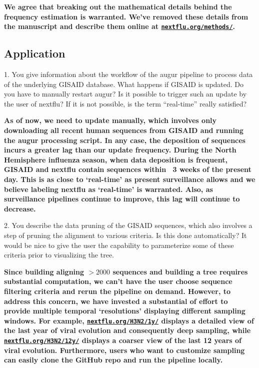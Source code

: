 \documentclass[11pt,oneside,letterpaper]{article}
\begin{document}
{\bf We agree that breaking out the mathematical details behind the frequency estimation is warranted. We've removed these details from the manuscript and describe them online at \href{http://nextflu.org/methods/}{\texttt{nextflu.org/methods/}}.}

\subsection*{Application}

1. You give information about the workflow of the augur pipeline to process data of the underlying GISAID database. What happens if GISAID is updated. Do you have to manually restart augur? Is it possible to trigger such an update by the user of nextflu? If it is not possible, is the term ``real-time'' really satisfied?

{\bf As of now, we need to update manually, which involves only downloading all recent human sequences from GISAID and running the augur processing script. In any case, the deposition of sequences incurs a greater lag than our update frequency. During the North Hemisphere influenza season, when data deposition is frequent, GISAID and nextflu contain sequences within ~3 weeks of the present day. This is as close to `real-time' as present surveillance allows and we believe labeling nextflu as `real-time' is warranted. Also, as surveillance pipelines continue to improve, this lag will continue to decrease.}

2. You describe the data pruning of the GISAID sequences, which also involves a step of pruning the alignment to various criteria. Is this done automatically? It would be nice to give the user the capability to parameterize some of these criteria prior to visualizing the tree.

{\bf Since building aligning $>2000$ sequences and building a tree requires substantial computation, we can't have the user choose sequence filtering criteria and rerun the pipeline on demand. However, to address this concern, we have invested a substantial of effort to provide multiple temporal `resolutions' displaying different sampling windows. For example, \href{http://nextflu.org/H3N2/1y/}{\texttt{nextflu.org/H3N2/1y/}} displays a detailed view of the last year of viral evolution and consequently deep sampling, while \href{http://nextflu.org/H3N2/12y/}{\texttt{nextflu.org/H3N2/12y/}} displays a coarser view of the last 12 years of viral evolution. Furthermore, users who want to customize sampling can easily clone the GitHub repo and run the pipeline locally.}
\end{document}
